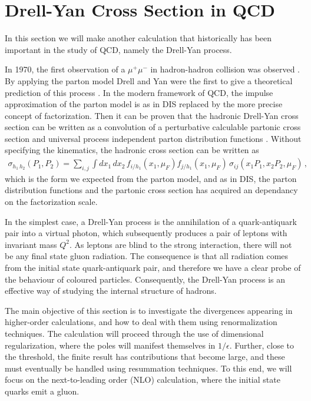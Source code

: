 \section{Drell-Yan Cross Section in QCD}\label{sec:Drell-Yan Hadronic Cross Section}
In this section we will make another calculation that historically has been important in the study of QCD, namely the Drell-Yan process.  

In 1970, the first observation of a $\mu^{+}\mu^{-}$ in hadron-hadron collision was observed \cite{Christenson:1970um}. By applying the parton model Drell and Yan were the first to give a theoretical prediction of this process \cite{Drell:1970wh}. In the modern framework of QCD, the impulse approximation of the parton model is as in DIS replaced by the more precise concept of factorization. Then it can be proven that the hadronic Drell-Yan cross section can be written as a convolution of a perturbative calculable partonic cross section and universal process independent parton distribution functions \cite{Collins:1989gx}. Without specifying the kinematics, the hadronic cross section can be written as
\begin{align}
  \sigma_{h_1\,h_2}(P_1,P_2)=\sum_{i,j}\int dx_1\,dx_2\,f_{i/h_1}(x_1,\mu_{F})f_{j/h_1}(x_1,\mu_{F})\,\hat{\sigma}_{ij}(x_1P_1,x_2P_2,\mu_{F})\,,
\end{align}
which is the form we expected from the parton model, and as in DIS, the parton distribution functions and the partonic cross section has acquired an dependancy on the factorization scale. 

In the simplest case, a Drell-Yan process is the annihilation of a quark-antiquark pair into a virtual photon, which subsequently produces a pair of leptons with invariant mass $Q^{2}$. As leptons are blind to the strong interaction, there will not be any final state gluon radiation. The consequence is that all radiation comes from the initial state quark-antiquark pair, and therefore we have a clear probe of the behaviour of coloured particles. Consequently, the Drell-Yan process is an effective way of studying the internal structure of hadrons.

The main objective of this section is to investigate the divergences appearing in higher-order calculations, and how to deal with them using renormalization techniques. The calculation will proceed through the use of dimensional regularization, where the poles will manifest themselves in $1/\epsilon$. Further, close to the threshold, the finite result has contributions that become large, and these must eventually be handled using resummation techniques. To this end, we will focus on the next-to-leading order (NLO) calculation, where the initial state quarks emit a gluon.

